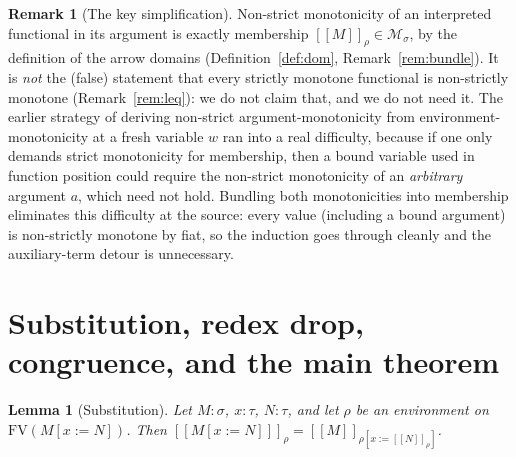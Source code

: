 \documentclass{amsart}
\newtheorem{lemma}{Lemma}
\theoremstyle{definition}
\newtheorem{remark}{Remark}
\newcommand{\interp}[1]{[\![#1]\!]}
\newcommand{\FV}{\mathrm{FV}}
\begin{document}
\begin{remark}[The key simplification]\label{rem:keyfix}
Non-strict monotonicity of an interpreted functional in its argument is exactly membership
$\interp{M}_\rho\in\mathcal M_\sigma$, by the definition of the arrow domains
(Definition~\ref{def:dom}, Remark~\ref{rem:bundle}). It is \emph{not} the (false) statement
that every strictly monotone functional is non-strictly monotone (Remark~\ref{rem:leq}): we
do not claim that, and we do not need it. The earlier strategy of deriving non-strict
argument-monotonicity from environment-monotonicity at a fresh variable $w$ ran into a real
difficulty, because if one only demands strict monotonicity for membership, then a bound
variable used in function position could require the non-strict monotonicity of an
\emph{arbitrary} argument $a$, which need not hold. Bundling both monotonicities into
membership eliminates this difficulty at the source: every value (including a bound
argument) is non-strictly monotone by fiat, so the induction goes through cleanly and the
auxiliary-term detour is unnecessary.
\end{remark}

\section{Substitution, redex drop, congruence, and the main theorem}

\begin{lemma}[Substitution]\label{lem:subst}
Let $M:\sigma$, $x:\tau$, $N:\tau$, and let $\rho$ be an environment on $\FV(M[x:=N])$.
Then $\interp{M[x:=N]}_\rho=\interp{M}_{\rho[x:=\interp{N}_\rho]}$.
\end{lemma}
\end{document}
